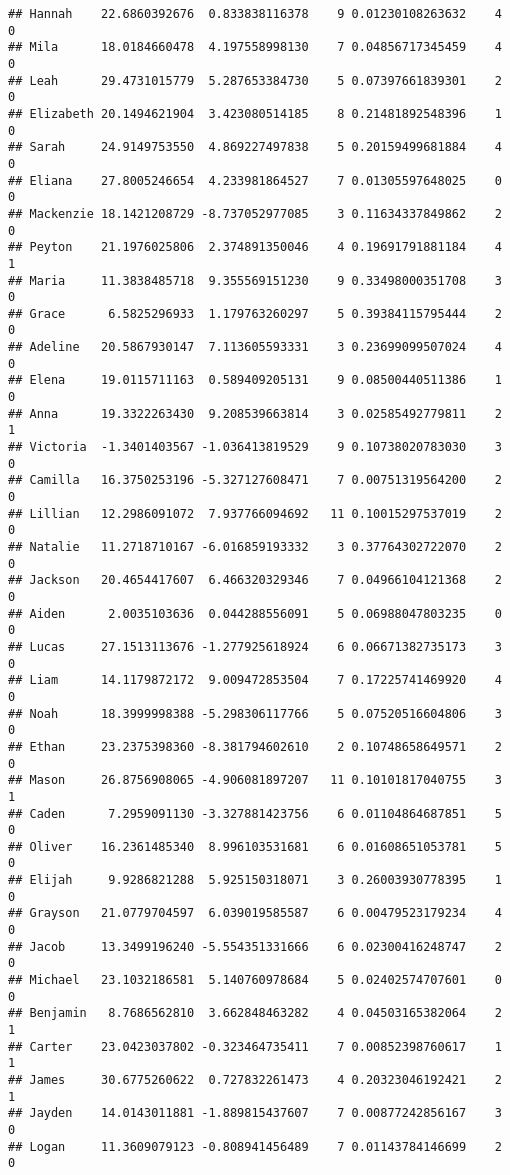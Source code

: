 \documentclass[
]{article}
\begin{document}
\begin{verbatim}
## Hannah    22.6860392676  0.833838116378    9 0.01230108263632    4    0
## Mila      18.0184660478  4.197558998130    7 0.04856717345459    4    0
## Leah      29.4731015779  5.287653384730    5 0.07397661839301    2    0
## Elizabeth 20.1494621904  3.423080514185    8 0.21481892548396    1    0
## Sarah     24.9149753550  4.869227497838    5 0.20159499681884    4    0
## Eliana    27.8005246654  4.233981864527    7 0.01305597648025    0    0
## Mackenzie 18.1421208729 -8.737052977085    3 0.11634337849862    2    0
## Peyton    21.1976025806  2.374891350046    4 0.19691791881184    4    1
## Maria     11.3838485718  9.355569151230    9 0.33498000351708    3    0
## Grace      6.5825296933  1.179763260297    5 0.39384115795444    2    0
## Adeline   20.5867930147  7.113605593331    3 0.23699099507024    4    0
## Elena     19.0115711163  0.589409205131    9 0.08500440511386    1    0
## Anna      19.3322263430  9.208539663814    3 0.02585492779811    2    1
## Victoria  -1.3401403567 -1.036413819529    9 0.10738020783030    3    0
## Camilla   16.3750253196 -5.327127608471    7 0.00751319564200    2    0
## Lillian   12.2986091072  7.937766094692   11 0.10015297537019    2    0
## Natalie   11.2718710167 -6.016859193332    3 0.37764302722070    2    0
## Jackson   20.4654417607  6.466320329346    7 0.04966104121368    2    0
## Aiden      2.0035103636  0.044288556091    5 0.06988047803235    0    0
## Lucas     27.1513113676 -1.277925618924    6 0.06671382735173    3    0
## Liam      14.1179872172  9.009472853504    7 0.17225741469920    4    0
## Noah      18.3999998388 -5.298306117766    5 0.07520516604806    3    0
## Ethan     23.2375398360 -8.381794602610    2 0.10748658649571    2    0
## Mason     26.8756908065 -4.906081897207   11 0.10101817040755    3    1
## Caden      7.2959091130 -3.327881423756    6 0.01104864687851    5    0
## Oliver    16.2361485340  8.996103531681    6 0.01608651053781    5    0
## Elijah     9.9286821288  5.925150318071    3 0.26003930778395    1    0
## Grayson   21.0779704597  6.039019585587    6 0.00479523179234    4    0
## Jacob     13.3499196240 -5.554351331666    6 0.02300416248747    2    0
## Michael   23.1032186581  5.140760978684    5 0.02402574707601    0    0
## Benjamin   8.7686562810  3.662848463282    4 0.04503165382064    2    1
## Carter    23.0423037802 -0.323464735411    7 0.00852398760617    1    1
## James     30.6775260622  0.727832261473    4 0.20323046192421    2    1
## Jayden    14.0143011881 -1.889815437607    7 0.00877242856167    3    0
## Logan     11.3609079123 -0.808941456489    7 0.01143784146699    2    0

\end{verbatim}
\end{document}
